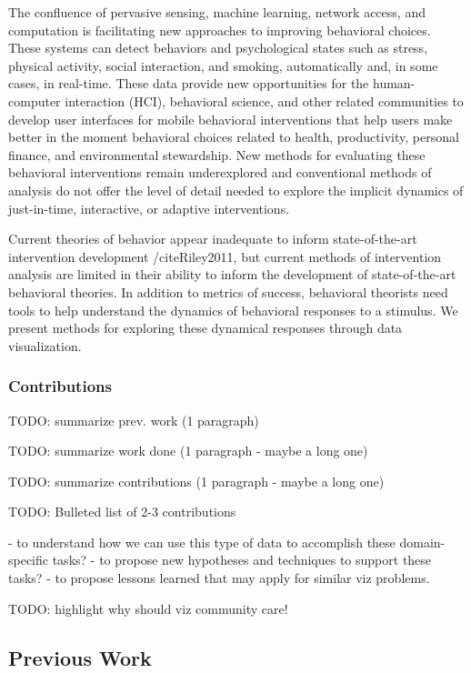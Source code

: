 \documentclass[review,journal]{vgtc}         %
\begin{document}
The confluence of pervasive sensing, machine learning, network access, and computation is facilitating new approaches to improving behavioral choices.
These systems can detect behaviors and psychological states such as stress\cite{chang2011,lu2012}, physical activity\cite{li2010,emken2012}, social interaction\cite{wyatt2011}, and smoking\cite{sazonov2011}, automatically and, in some cases, in real-time.
These data provide new opportunities for the human-computer interaction (HCI), behavioral science, and other related communities to develop user interfaces for mobile behavioral interventions that help users make better in the moment behavioral choices related to health\cite{klasnja2012,nahum2012}, productivity\cite{ho2005,sohn2005,jewell2011}, personal finance\cite{gallego2012}, and environmental stewardship.\cite{elliott2012}
New methods for evaluating these behavioral interventions remain underexplored and conventional methods of analysis do not offer the level of detail needed to explore the implicit dynamics of just-in-time, interactive, or adaptive interventions.

Current theories of behavior appear inadequate to inform state-of-the-art intervention development /cite{Riley2011}, but current methods of intervention analysis are limited in their ability to inform the development of state-of-the-art behavioral theories.
In addition to metrics of success, behavioral theorists need tools to help understand the dynamics of behavioral responses to a stimulus.
We present methods for exploring these dynamical responses through data visualization.

\subsubsection{Contributions}
TODO: summarize prev. work (1 paragraph)

TODO: summarize work done (1 paragraph - maybe a long one)

TODO: summarize contributions (1 paragraph - maybe a long one)

TODO: Bulleted list of 2-3 contributions

  - to understand how we can use this type of data to accomplish these domain-specific tasks?
  - to propose new hypotheses and techniques to support these tasks?
  - to propose lessons learned that may apply for similar viz problems.

TODO: highlight why should viz community care!

\subsection{Previous Work}
\end{document}
